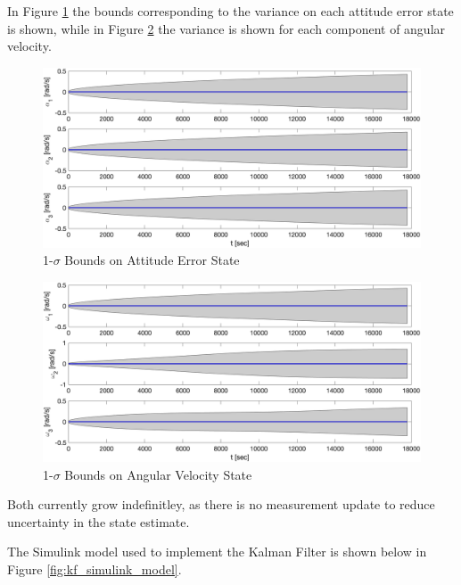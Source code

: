In Figure \ref{fig:kf_time_update_attitude_statistics} the bounds corresponding to the variance on each attitude error state is shown, while in Figure \ref{fig:kf_time_update_vel_statistics} the variance is shown for each component of angular velocity.

\begin{figure}[H]
    \centering
    \captionsetup{ justification = centering}
    \includegraphics[width = 15cm]{Images/PS7/kalman_filter_att_cov_bounds.png}
    \caption{1-$\sigma$ Bounds on Attitude Error State}
    \label{fig:kf_time_update_attitude_statistics}
\end{figure}

\begin{figure}[H]
    \centering
    \captionsetup{ justification = centering}
    \includegraphics[width = 15cm]{Images/PS7/kalman_filter_omega_cov_bounds.png}
    \caption{1-$\sigma$ Bounds on Angular Velocity State}
    \label{fig:kf_time_update_vel_statistics}
\end{figure}

Both currently grow indefinitley, as there is no measurement update to reduce uncertainty in the state estimate.

The Simulink model used to implement the Kalman Filter is shown below in Figure \ref{fig:kf_simulink_model}.

